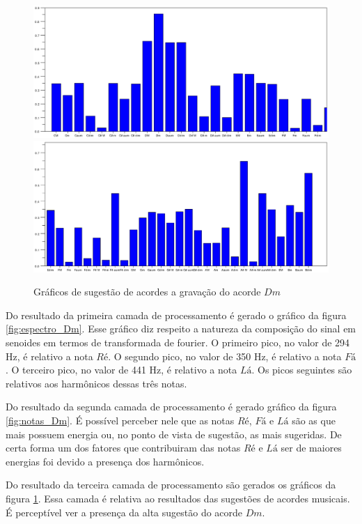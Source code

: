 \begin{figure}[h]
	\centering
		\includegraphics[keepaspectratio=true,scale=0.49]{figuras/Dm/acordes_1_Dm.eps}
		\includegraphics[keepaspectratio=true,scale=0.49]{figuras/Dm/acordes_2_Dm.eps}
	\caption{Gráficos de sugestão de acordes a gravação do acorde $Dm$}
  \label{fig:acordes_Dm}
\end{figure}
\newpage

Do resultado da primeira camada de processamento é gerado o gráfico da figura \ref{fig:espectro_Dm}. Esse gráfico diz respeito a natureza da composição do sinal em senoides em termos de transformada de fourier. O primeiro pico, no valor de 294 Hz, é relativo a nota $Ré$. O segundo pico, no valor de 350 Hz, é relativo a nota $Fá$. O terceiro pico, no valor de 441 Hz, é relativo a nota $Lá$. Os picos seguintes são relativos aos harmônicos dessas três notas.

Do resultado da segunda camada de processamento é gerado gráfico da figura \ref{fig:notas_Dm}. É possível perceber nele que as notas $Ré$, $Fá$ e $Lá$ são as que mais possuem energia ou, no ponto de vista de sugestão, as mais sugeridas. De certa forma um dos fatores que contribuiram das notas $Ré$ e $Lá$ ser de maiores energias foi devido a presença dos harmônicos.

Do resultado da terceira camada de processamento são gerados os gráficos da figura \ref{fig:acordes_Dm}. Essa camada é relativa ao resultados das sugestões de acordes musicais. É perceptível ver a presença da alta sugestão do acorde $Dm$.

